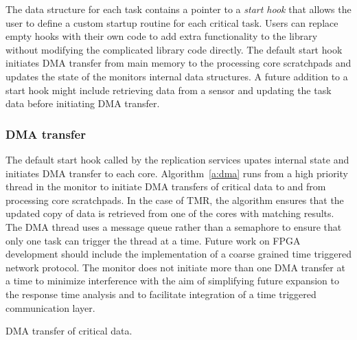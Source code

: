 	The data structure for each task contains a pointer to a \emph{start hook} that allows the user to define a custom startup routine for each critical task.
	Users can replace empty hooks with their own code to add extra functionality to the library without modifying the complicated library code directly. 
	The default start hook initiates DMA transfer from main memory to the processing core scratchpads and updates the state of the monitors internal data structures.
	A future addition to a start hook might include retrieving data from a sensor and updating the task data before initiating DMA transfer.		



\subsubsection{DMA transfer}
\label{s:dma-trans}
	The default start hook called by the replication services upates internal state and initiates DMA transfer to each core. 
	Algorithm~\ref{a:dma} runs from a high priority thread in the monitor to initiate DMA transfers of critical data to and from processing core scratchpads.
	In the case of TMR, the algorithm ensures that the updated copy of data is retrieved from one of the cores with matching results.
	The DMA thread uses a message queue rather than a semaphore to ensure that only one task can trigger the thread at a time.
	Future work on FPGA development should include the implementation of a coarse grained time triggered network protocol. 
	The monitor does not initiate more than one DMA transfer at a time to minimize interference with the aim of simplifying future expansion to the response time analysis and to facilitate integration of a time triggered communication layer.

\begin{algorithm}

\caption{DMA transfer of critical data.}
\label{a:dma}
\end{algorithm}

